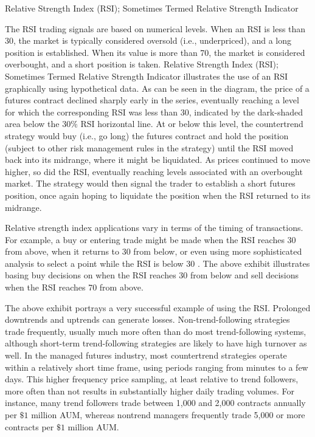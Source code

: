 \documentclass[11pt]{article}
\begin{document}
Relative Strength Index (RSI); Sometimes Termed Relative Strength Indicator

The RSI trading signals are based on numerical levels. When an RSI is less than 30, the market is typically considered oversold (i.e., underpriced), and a long position is established. When its value is more than 70, the market is considered overbought, and a short position is taken. Relative Strength Index (RSI); Sometimes Termed Relative Strength Indicator illustrates the use of an RSI graphically using hypothetical data. As can be seen in the diagram, the price of a futures contract declined sharply early in the series, eventually reaching a level for which the corresponding RSI was less than 30, indicated by the dark-shaded area below the $30 \%$ RSI horizontal line. At or below this level, the countertrend strategy would buy (i.e., go long) the futures contract and hold the position (subject to other risk management rules in the strategy) until the RSI moved back into its midrange, where it might be liquidated. As prices continued to move higher, so did the RSI, eventually reaching levels associated with an overbought market. The strategy would then signal the trader to establish a short futures position, once again hoping to liquidate the position when the RSI returned to its midrange.

Relative strength index applications vary in terms of the timing of transactions. For example, a buy or entering trade might be made when the RSI reaches 30 from above, when it returns to 30 from below, or even using more sophisticated analysis to select a point while the RSI is below 30 . The above exhibit illustrates basing buy decisions on when the RSI reaches 30 from below and sell decisions when the RSI reaches 70 from above.

The above exhibit portrays a very successful example of using the RSI. Prolonged downtrends and uptrends can generate losses. Non-trend-following strategies trade frequently, usually much more often than do most trend-following systems, although short-term trend-following strategies are likely to have high turnover as well. In the managed futures industry, most countertrend strategies operate within a relatively short time frame, using periods ranging from minutes to a few days. This higher frequency price sampling, at least relative to trend followers, more often than not results in substantially higher daily trading volumes. For instance, many trend followers trade between 1,000 and 2,000 contracts annually per $\$ 1$ million AUM, whereas nontrend managers frequently trade 5,000 or more contracts per $\$ 1$ million AUM.
\end{document}
